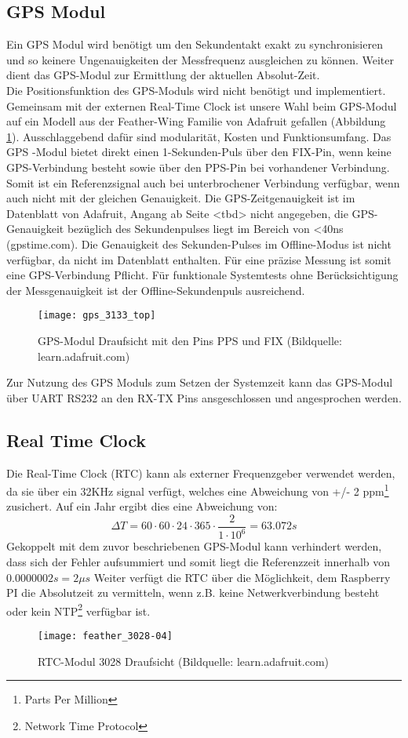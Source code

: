 \subsection{GPS Modul}
	Ein GPS Modul wird benötigt um den Sekundentakt exakt zu synchronisieren und so keinere Ungenauigkeiten der Messfrequenz ausgleichen zu können. Weiter dient das GPS-Modul zur Ermittlung der aktuellen Absolut-Zeit.\\
	Die Positionsfunktion des GPS-Moduls wird nicht benötigt und implementiert. Gemeinsam mit der externen Real-Time Clock ist unsere Wahl beim GPS-Modul auf ein Modell aus der Feather-Wing Familie von Adafruit gefallen (Abbildung \ref{fig:GPS3133}). Ausschlaggebend dafür sind modularität, Kosten und Funktionsumfang. Das GPS -Modul bietet direkt einen 1-Sekunden-Puls über den FIX-Pin, wenn keine GPS-Verbindung besteht sowie über den PPS-Pin bei vorhandener Verbindung. Somit ist ein Referenzsignal auch bei unterbrochener Verbindung verfügbar, wenn auch nicht mit der gleichen Genauigkeit. Die GPS-Zeitgenauigkeit ist im Datenblatt von Adafruit, Angang ab Seite <tbd> nicht angegeben, die GPS-Genauigkeit bezüglich des Sekundenpulses liegt im Bereich von <40ns (gpstime.com). Die Genauigkeit des Sekunden-Pulses im Offline-Modus ist nicht verfügbar, da nicht im Datenblatt enthalten. Für eine präzise Messung ist somit eine GPS-Verbindung Pflicht. Für funktionale Systemtests ohne Berücksichtigung der Messgenauigkeit ist der Offline-Sekundenpuls ausreichend.
		\begin{figure}[H]
        	\centering
        	\texttt{[image: gps\_3133\_top]}
        	\caption{GPS-Modul Draufsicht mit den Pins PPS und FIX (Bildquelle: learn.adafruit.com)}
        	\label{fig:GPS3133}
    	\end{figure}
	Zur Nutzung des GPS Moduls zum Setzen der Systemzeit kann das GPS-Modul über UART RS232 an den RX-TX Pins ansgeschlossen und angesprochen werden.
%
%	
\subsection{Real Time Clock}
\label{cap:RTC}
	Die Real-Time Clock (RTC) kann als externer Frequenzgeber verwendet werden, da sie über ein 32KHz signal verfügt, welches eine Abweichung von +/- 2 ppm\footnote{Parts Per Million} zusichert. Auf ein Jahr ergibt dies eine Abweichung von:
	\[
		\Delta{T} = 60 \cdot 60 \cdot 24 \cdot 365 \cdot \frac{2}{1\cdot 10^6} = 63.072s
	\]
	Gekoppelt mit dem zuvor beschriebenen GPS-Modul kann verhindert werden, dass sich der Fehler aufsummiert und somit liegt die Referenzzeit innerhalb von $0.0000002s = 2\mu{s}$ 
	Weiter verfügt die RTC über die Möglichkeit, dem Raspberry PI die Absolutzeit zu vermitteln, wenn z.B. keine Netwerkverbindung besteht oder kein NTP\footnote{Network Time Protocol} verfügbar ist.
		\begin{figure}[H]
        	\centering
        	\texttt{[image: feather\_3028-04]}
        	\caption{RTC-Modul 3028 Draufsicht (Bildquelle: learn.adafruit.com)}
        	\label{fig:RTC3028}
    	\end{figure}
%
%
